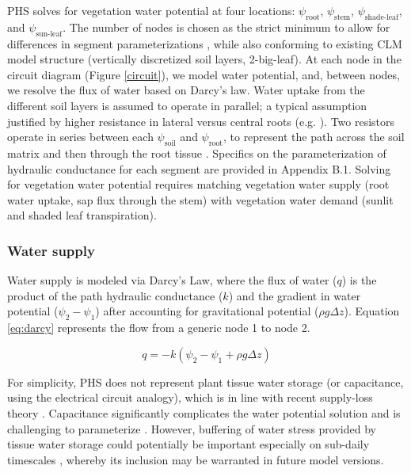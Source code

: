 \documentclass[draft,linenumbers]{agujournal}
\begin{document}
  PHS solves for vegetation water potential at four locations: $\psi_{\text{root}}$, $\psi_{\text{stem}}$, $\psi_{\text{shade-leaf}}$, and $\psi_{\text{sun-leaf}}$.
  The number of nodes is chosen as the strict minimum to allow for differences in segment parameterizations \citep{simonin2015, sperry2015}, while also conforming to existing CLM model structure (vertically discretized soil layers, 2-big-leaf).
  At each node in the circuit diagram (Figure \ref{circuit}), we model water potential, and, between nodes, we resolve the flux of water based on Darcy's law. 
  Water uptake from the different soil layers is assumed to operate in parallel; a typical assumption justified by higher resistance in lateral versus central roots (e.g. \cite{williams2001}). 
  Two resistors operate in series between each $\psi_{\text{soil}}$ and $\psi_{\text{root}}$, to represent the path across the soil matrix and then through the root tissue \citep{williams1996}. 
  Specifics on the parameterization of hydraulic conductance for each segment are provided in Appendix B.1.
  Solving for vegetation water potential requires matching vegetation water supply (root water uptake, sap flux through the stem) with vegetation water demand (sunlit and shaded leaf transpiration).

   
    \subsubsection{Water supply}
    \label{sect:supply}
    Water supply is modeled via Darcy's Law, where the flux of water ($q$) is the product of the path hydraulic conductance ($k$) and the gradient in water potential ($\psi_2-\psi_1$) after accounting for gravitational potential ($\rho g \Delta z$).  
    Equation \ref{eq:darcy} represents the flow from a generic node 1 to node 2. 
    
     \begin{linenomath*}
     \begin{equation}
     \label{eq:darcy}
     q = -k\left(\psi_2 - \psi_1 + \rho g \Delta z\right)
     \end{equation}
     \end{linenomath*}
    
    For simplicity, PHS does not represent plant tissue water storage (or capacitance, using the electrical circuit analogy), which is in line with recent supply-loss theory \citep{sperry2015}.  
    Capacitance significantly complicates the water potential solution \citep{celia1990} and is challenging to parameterize \citep{bartlett2016}. 
    However, buffering of water stress provided by tissue water storage could potentially be important especially on sub-daily timescales \citep{meinzer2009,epila2017}, 
    whereby its inclusion may be warranted in future model versions.
\end{document}
